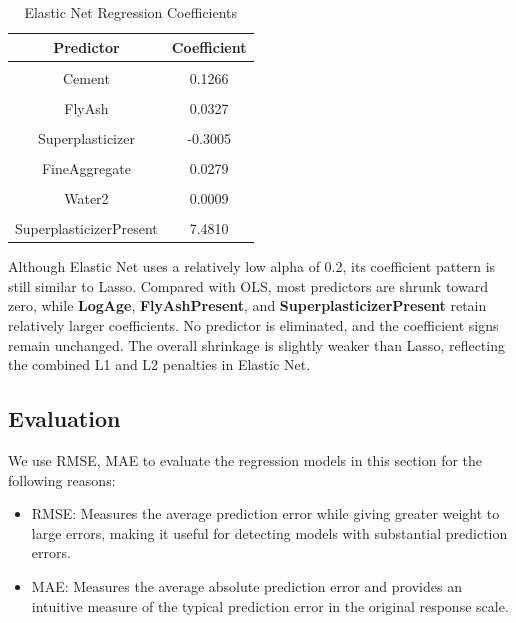 \documentclass[
  11pt,
]{article}
\providecommand{\tightlist}{%
  \setlength{\itemsep}{0pt}\setlength{\parskip}{0pt}}
\begin{document}
\begin{table}[!h]
\centering
\caption{\label{tab:elastic-net}Elastic Net Regression Coefficients}
\centering
\fontsize{10}{12}\selectfont
\begin{tabular}[t]{cc}
\toprule
\textbf{Predictor} & \textbf{Coefficient}\\
\midrule
\cellcolor{gray!10}{(Intercept)} & \cellcolor{gray!10}{-26.7288}\\
Cement & 0.1266\\
\cellcolor{gray!10}{BlastFurnaceSlag} & \cellcolor{gray!10}{0.1064}\\
FlyAsh & 0.0327\\
\cellcolor{gray!10}{Water} & \cellcolor{gray!10}{-0.4921}\\
\addlinespace
Superplasticizer & -0.3005\\
\cellcolor{gray!10}{CoarseAggregate} & \cellcolor{gray!10}{0.0236}\\
FineAggregate & 0.0279\\
\cellcolor{gray!10}{LogAge} & \cellcolor{gray!10}{8.6321}\\
Water2 & 0.0009\\
\addlinespace
\cellcolor{gray!10}{FlyAshPresent} & \cellcolor{gray!10}{3.6040}\\
SuperplasticizerPresent & 7.4810\\
\bottomrule
\end{tabular}
\end{table}

Although Elastic Net uses a relatively low alpha of 0.2, its coefficient
pattern is still similar to Lasso. Compared with OLS, most predictors
are shrunk toward zero, while \textbf{LogAge}, \textbf{FlyAshPresent},
and \textbf{SuperplasticizerPresent} retain relatively larger
coefficients. No predictor is eliminated, and the coefficient signs
remain unchanged. The overall shrinkage is slightly weaker than Lasso,
reflecting the combined L1 and L2 penalties in Elastic Net.

\subsection{Evaluation}\label{evaluation}

We use RMSE, MAE to evaluate the regression models in this section for
the following reasons:

\begin{itemize}
\tightlist
\item
  RMSE: Measures the average prediction error while giving greater
  weight to large errors, making it useful for detecting models with
  substantial prediction errors.
\item
  MAE: Measures the average absolute prediction error and provides an
  intuitive measure of the typical prediction error in the original
  response scale.
\end{itemize}
\end{document}
